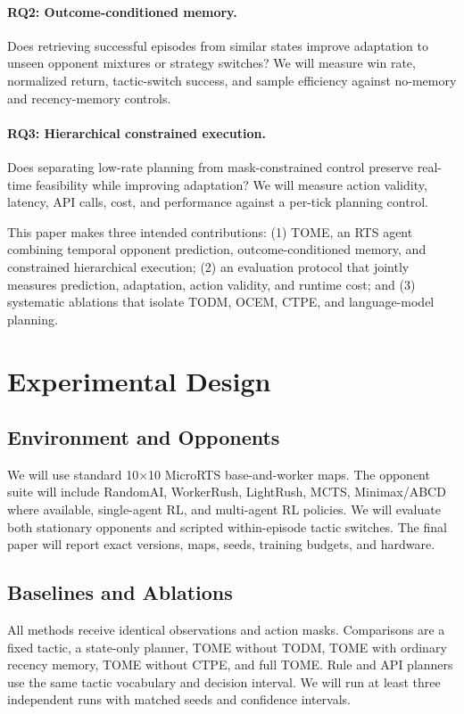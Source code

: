 \documentclass[11pt]{article}
\begin{document}
\paragraph{RQ2: Outcome-conditioned memory.} Does retrieving successful
episodes from similar states improve adaptation to unseen opponent mixtures or
strategy switches? We will measure win rate, normalized return, tactic-switch
success, and sample efficiency against no-memory and recency-memory controls.

\paragraph{RQ3: Hierarchical constrained execution.} Does separating
low-rate planning from mask-constrained control preserve real-time feasibility
while improving adaptation? We will measure action validity, latency, API calls,
cost, and performance against a per-tick planning control.

This paper makes three intended contributions: (1) TOME, an RTS agent combining
temporal opponent prediction, outcome-conditioned memory, and constrained
hierarchical execution; (2) an evaluation protocol that jointly measures
prediction, adaptation, action validity, and runtime cost; and (3) systematic
ablations that isolate TODM, OCEM, CTPE, and language-model planning.

\section{Experimental Design}

\subsection{Environment and Opponents}

We will use standard 10$\times$10 MicroRTS base-and-worker maps. The opponent
suite will include RandomAI, WorkerRush, LightRush, MCTS, Minimax/ABCD where
available, single-agent RL, and multi-agent RL policies. We will evaluate both
stationary opponents and scripted within-episode tactic switches. The final
paper will report exact versions, maps, seeds, training budgets, and hardware.

\subsection{Baselines and Ablations}

All methods receive identical observations and action masks. Comparisons are a
fixed tactic, a state-only planner, TOME without TODM, TOME with ordinary
recency memory, TOME without CTPE, and full TOME. Rule and API planners use the
same tactic vocabulary and decision interval. We will run at least three
independent runs with matched seeds and confidence intervals.
\end{document}
